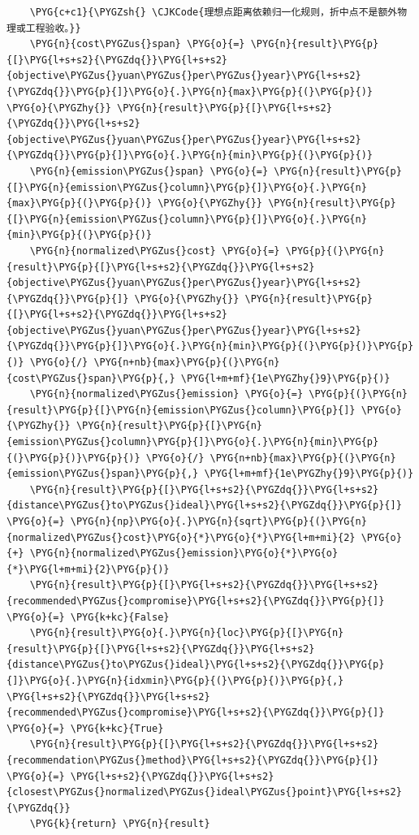\begin{Verbatim}
    \PYG{c+c1}{\PYGZsh{} \CJKCode{理想点距离依赖归一化规则，折中点不是额外物理或工程验收。}}
    \PYG{n}{cost\PYGZus{}span} \PYG{o}{=} \PYG{n}{result}\PYG{p}{[}\PYG{l+s+s2}{\PYGZdq{}}\PYG{l+s+s2}{objective\PYGZus{}yuan\PYGZus{}per\PYGZus{}year}\PYG{l+s+s2}{\PYGZdq{}}\PYG{p}{]}\PYG{o}{.}\PYG{n}{max}\PYG{p}{(}\PYG{p}{)} \PYG{o}{\PYGZhy{}} \PYG{n}{result}\PYG{p}{[}\PYG{l+s+s2}{\PYGZdq{}}\PYG{l+s+s2}{objective\PYGZus{}yuan\PYGZus{}per\PYGZus{}year}\PYG{l+s+s2}{\PYGZdq{}}\PYG{p}{]}\PYG{o}{.}\PYG{n}{min}\PYG{p}{(}\PYG{p}{)}
    \PYG{n}{emission\PYGZus{}span} \PYG{o}{=} \PYG{n}{result}\PYG{p}{[}\PYG{n}{emission\PYGZus{}column}\PYG{p}{]}\PYG{o}{.}\PYG{n}{max}\PYG{p}{(}\PYG{p}{)} \PYG{o}{\PYGZhy{}} \PYG{n}{result}\PYG{p}{[}\PYG{n}{emission\PYGZus{}column}\PYG{p}{]}\PYG{o}{.}\PYG{n}{min}\PYG{p}{(}\PYG{p}{)}
    \PYG{n}{normalized\PYGZus{}cost} \PYG{o}{=} \PYG{p}{(}\PYG{n}{result}\PYG{p}{[}\PYG{l+s+s2}{\PYGZdq{}}\PYG{l+s+s2}{objective\PYGZus{}yuan\PYGZus{}per\PYGZus{}year}\PYG{l+s+s2}{\PYGZdq{}}\PYG{p}{]} \PYG{o}{\PYGZhy{}} \PYG{n}{result}\PYG{p}{[}\PYG{l+s+s2}{\PYGZdq{}}\PYG{l+s+s2}{objective\PYGZus{}yuan\PYGZus{}per\PYGZus{}year}\PYG{l+s+s2}{\PYGZdq{}}\PYG{p}{]}\PYG{o}{.}\PYG{n}{min}\PYG{p}{(}\PYG{p}{)}\PYG{p}{)} \PYG{o}{/} \PYG{n+nb}{max}\PYG{p}{(}\PYG{n}{cost\PYGZus{}span}\PYG{p}{,} \PYG{l+m+mf}{1e\PYGZhy{}9}\PYG{p}{)}
    \PYG{n}{normalized\PYGZus{}emission} \PYG{o}{=} \PYG{p}{(}\PYG{n}{result}\PYG{p}{[}\PYG{n}{emission\PYGZus{}column}\PYG{p}{]} \PYG{o}{\PYGZhy{}} \PYG{n}{result}\PYG{p}{[}\PYG{n}{emission\PYGZus{}column}\PYG{p}{]}\PYG{o}{.}\PYG{n}{min}\PYG{p}{(}\PYG{p}{)}\PYG{p}{)} \PYG{o}{/} \PYG{n+nb}{max}\PYG{p}{(}\PYG{n}{emission\PYGZus{}span}\PYG{p}{,} \PYG{l+m+mf}{1e\PYGZhy{}9}\PYG{p}{)}
    \PYG{n}{result}\PYG{p}{[}\PYG{l+s+s2}{\PYGZdq{}}\PYG{l+s+s2}{distance\PYGZus{}to\PYGZus{}ideal}\PYG{l+s+s2}{\PYGZdq{}}\PYG{p}{]} \PYG{o}{=} \PYG{n}{np}\PYG{o}{.}\PYG{n}{sqrt}\PYG{p}{(}\PYG{n}{normalized\PYGZus{}cost}\PYG{o}{*}\PYG{o}{*}\PYG{l+m+mi}{2} \PYG{o}{+} \PYG{n}{normalized\PYGZus{}emission}\PYG{o}{*}\PYG{o}{*}\PYG{l+m+mi}{2}\PYG{p}{)}
    \PYG{n}{result}\PYG{p}{[}\PYG{l+s+s2}{\PYGZdq{}}\PYG{l+s+s2}{recommended\PYGZus{}compromise}\PYG{l+s+s2}{\PYGZdq{}}\PYG{p}{]} \PYG{o}{=} \PYG{k+kc}{False}
    \PYG{n}{result}\PYG{o}{.}\PYG{n}{loc}\PYG{p}{[}\PYG{n}{result}\PYG{p}{[}\PYG{l+s+s2}{\PYGZdq{}}\PYG{l+s+s2}{distance\PYGZus{}to\PYGZus{}ideal}\PYG{l+s+s2}{\PYGZdq{}}\PYG{p}{]}\PYG{o}{.}\PYG{n}{idxmin}\PYG{p}{(}\PYG{p}{)}\PYG{p}{,} \PYG{l+s+s2}{\PYGZdq{}}\PYG{l+s+s2}{recommended\PYGZus{}compromise}\PYG{l+s+s2}{\PYGZdq{}}\PYG{p}{]} \PYG{o}{=} \PYG{k+kc}{True}
    \PYG{n}{result}\PYG{p}{[}\PYG{l+s+s2}{\PYGZdq{}}\PYG{l+s+s2}{recommendation\PYGZus{}method}\PYG{l+s+s2}{\PYGZdq{}}\PYG{p}{]} \PYG{o}{=} \PYG{l+s+s2}{\PYGZdq{}}\PYG{l+s+s2}{closest\PYGZus{}normalized\PYGZus{}ideal\PYGZus{}point}\PYG{l+s+s2}{\PYGZdq{}}
    \PYG{k}{return} \PYG{n}{result}
\end{Verbatim}
